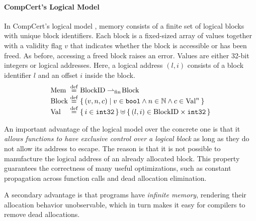 \paragraph{CompCert's Logical Model}

In CompCert's logical model
\cite{leroy:compcert,Leroy-Appel-Blazy-Stewart-memory-v2}, memory
consists of a finite set of logical blocks with unique block
identifiers.  Each block is a fixed-sized array of values together
with a validity flag $v$ that indicates whether the block is accessible or
has been freed. As before, accessing a freed block raises an error.
Values are either 32-bit integers or logical addresses.  Here, a
logical address $(l,i)$ consists of a block identifier $l$ and an
offset $i$ inside the block.
\[
\begin{array}{@{}l@{~}c@{~}l@{}}
\mathrm{Mem} &\defeq& \mathrm{BlockID} \fpfun \mathrm{Block} \\
\mathrm{Block} &\defeq&
\setof{(v, n, c) \suchthat
  v \in \mathtt{bool} \land n \in \Nat \land c \in \mathrm{Val}^n } \\
\mathrm{Val} &\defeq& \setof{i\in\mathtt{int32}} \uplus \setof{(l,i) \in \mathrm{BlockID}\times \mathtt{int32}}
\end{array}
\]

An important advantage of the logical model over the concrete one is that 
it \emph{allows functions to have exclusive control over a logical block} as 
long as they do not allow its address to escape. The reason is that it
is not possible to manufacture the logical address of an already allocated block.  
This property guarantees the correctness of many useful optimizations, 
such as constant propagation across function calls and dead allocation
elimination.

A secondary advantage is that programs have \emph{infinite memory}, rendering
their allocation behavior unobservable, which in turn makes it easy for
compilers to remove dead allocations.


